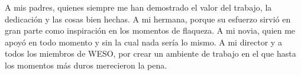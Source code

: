A mis padres, quienes siempre me han demostrado el valor del trabajo, la dedicación
y las cosas bien hechas.  A mi hermana, porque su esfuerzo sirvió en gran parte 
como inspiración en los momentos de flaqueza.  A mi novia, quien me apoyó en todo
momento y sin la cual nada sería lo mismo.  A mi director y a todos los miembros de WESO, 
por crear un ambiente de trabajo en el que hasta los momentos más duros merecieron
la pena.